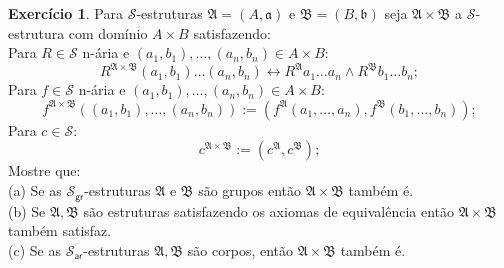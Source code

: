 \documentclass[11pt]{article}
\theoremstyle{definition}
\newtheorem{exer}{Exercício}
\newcommand{\sse}{\leftrightarrow}
\newcommand{\mc}[1]{\mathcal{#1}}
\newcommand{\mf}[1]{\mathfrak{#1}}
\newcommand{\msf}[1]{\mathsf{#1}}
\begin{document}
\begin{exer}
Para $\mc{S}$-estruturas $\mf{A}=(A,\mf{a})$ e $\mf{B}=(B,\mf{b})$ seja $\mf{A}\times\mf{B}$ a $\mc{S}$-estrutura com domínio $A\times B$ satisfazendo:\\
Para $R\in\mc{S}$ n-ária e $(a_1,b_1),\dots,(a_n,b_n)\in A\times B$:
\[
R^{\mf{A}\times\mf{B}}(a_1,b_1)\dots(a_n,b_n)\sse R^\mf{A}a_1\dots a_n\wedge R^\mf{B}b_1\dots b_n;
\]
Para $f\in\mc{S}$ n-ária e $(a_1,b_1),\dots,(a_n,b_n)\in A\times B$:
\[
f^{\mf{A}\times\mf{B}}((a_1,b_1),\dots,(a_n,b_n)):=(f^\mf{A}(a_1,\dots,a_n),f^\mf{B}(b_1,\dots,b_n));
\]
Para $c\in\mc{S}$:
\[
c^{\mf{A}\times\mf{B}}:=(c^\mf{A},c^\mf{B});
\]
Mostre que:\\
(a) Se as $\mc{S}_{\msf{gr}}$-estruturas $\mf{A}$ e $\mf{B}$ são grupos então $\mf{A}\times\mf{B}$ também é.\\
(b) Se $\mf{A},\mf{B}$ são estruturas satisfazendo os axiomas de equivalência então $\mf{A}\times\mf{B}$ também satisfaz.\\
(c) Se as $\mc{S}_{\msf{ar}}$-estruturas $\mf{A},\mf{B}$ são corpos, então $\mf{A}\times\mf{B}$ também é.


\end{exer}
\end{document}
